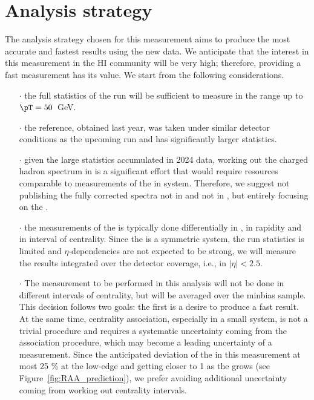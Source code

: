 \section{Analysis strategy}
The analysis strategy chosen for this measurement aims to produce the most accurate and fastest results using the new data. We anticipate that the interest in this measurement in the HI community will be very high; therefore, providing a fast measurement has its value. We start from the following considerations.
\begin{itemize}
\item[$\cdot$] the full statistics of the \OO run will be sufficient to measure \RAA in the range up to $\pT=50$~GeV.
\item[$\cdot$] the \pp reference, obtained last year, was taken under similar detector conditions as the upcoming run and has significantly larger statistics.
\item[$\cdot$] given the large statistics accumulated in 2024 data, working out the charged hadron spectrum in \pp is a significant effort that would require resources comparable to measurements of the \RAA in \OO system. Therefore, we suggest not publishing the fully corrected spectra not in \pp and not in \OO, but entirely focusing on the \RAA.
\item[$\cdot$] the measurements of the \RAA is typically done differentially in \pT, in rapidity and in interval of centrality. Since the \OO is a symmetric system, the run statistics is limited and $\eta$-dependencies are not expected to be strong, we will measure the results integrated over the detector coverage, i.e., in $|\eta|<2.5$.
\item[$\cdot$] The measurement to be performed in this analysis will not be done in different intervals of centrality, but will be averaged over the minbias sample. This decision follows two goals: the first is a desire to produce a fast result. At the same time, centrality association, especially in a small system, is not a trivial procedure and requires a systematic uncertainty coming from the association procedure, which may become a leading uncertainty of a measurement. Since the anticipated deviation of the \RAA in this measurement at most 25 \% at the low-\pT edge and getting closer to 1 as the \pT grows (see Figure~\ref{fig:RAA_prediction}), we prefer avoiding additional uncertainty coming from working out centrality intervals.
\end{itemize}

